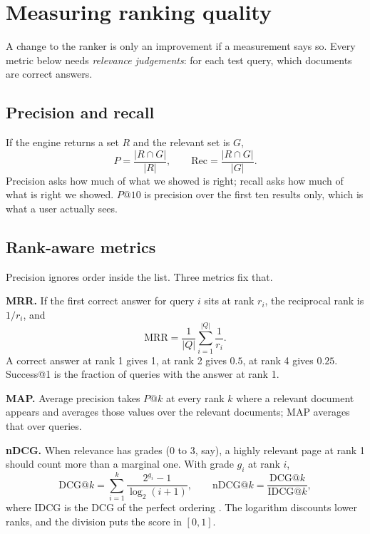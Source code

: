 \documentclass[9pt,twocolumn,a4paper]{extarticle}
\begin{document}
\section{Measuring ranking quality}
\label{sec:eval}
A change to the ranker is only an improvement if a measurement says so. Every metric below needs \emph{relevance judgements}: for each test query, which documents are correct answers.

\subsection{Precision and recall}
If the engine returns a set $R$ and the relevant set is $G$,
\begin{equation}
P=\frac{|R\cap G|}{|R|},\qquad \text{Rec}=\frac{|R\cap G|}{|G|}.
\label{eq:pr}
\end{equation}
Precision asks how much of what we showed is right; recall asks how much of what is right we showed. $P@10$ is precision over the first ten results only, which is what a user actually sees.

\subsection{Rank-aware metrics}
Precision ignores order inside the list. Three metrics fix that.

\textbf{MRR.} If the first correct answer for query $i$ sits at rank $r_i$, the reciprocal rank is $1/r_i$, and
\begin{equation}
\text{MRR}=\frac{1}{|Q|}\sum_{i=1}^{|Q|}\frac{1}{r_i}.
\label{eq:mrr}
\end{equation}
A correct answer at rank 1 gives 1, at rank 2 gives $0.5$, at rank 4 gives $0.25$. Success@1 is the fraction of queries with the answer at rank 1.

\textbf{MAP.} Average precision takes $P@k$ at every rank $k$ where a relevant document appears and averages those values over the relevant documents; MAP averages that over queries.

\textbf{nDCG.} When relevance has grades (0 to 3, say), a highly relevant page at rank 1 should count more than a marginal one. With grade $g_i$ at rank $i$,
\begin{equation}
\text{DCG}@k=\sum_{i=1}^{k}\frac{2^{g_i}-1}{\log_2(i+1)},\qquad
\text{nDCG}@k=\frac{\text{DCG}@k}{\text{IDCG}@k},
\label{eq:ndcg}
\end{equation}
where IDCG is the DCG of the perfect ordering \cite{jarvelin2002}. The logarithm discounts lower ranks, and the division puts the score in $[0,1]$.
\end{document}
